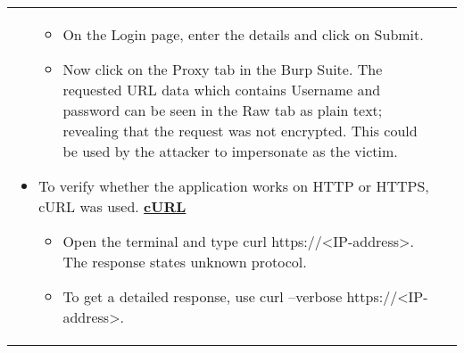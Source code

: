 \begin{longtable*}{p{.20\textwidth} | p{.80\textwidth}}
\begin{itemize}
\begin{itemize}
       		  \item On the Login page, enter the details and click on Submit.
       		  
       		  \item Now click  on the Proxy tab in the Burp Suite. The requested URL data which contains Username and password can be seen in the Raw tab as plain text; revealing that the request was not encrypted. This could be used by the attacker to impersonate as the victim. 
       		\end{itemize}
       	\item To verify whether the application works on HTTP or HTTPS, cURL was used. \underline{\textbf{cURL}}
       		\begin{itemize}
       		  \item Open the terminal and type curl https://<IP-address>.
       		         The response states unknown protocol.
       		 \item  To get a detailed response, use curl --verbose https://<IP-address>.
       		 

\end{itemize}
\end{itemize}
\end{longtable*}
